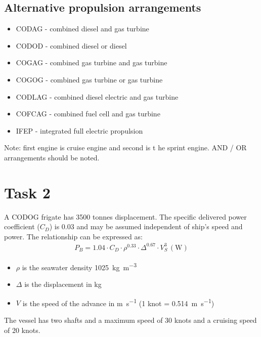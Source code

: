 \subsection{Alternative propulsion arrangements}
\begin{itemize}
    \item CODAG - combined diesel and gas turbine
    \item CODOD - combined diesel or diesel
    \item COGAG - combined gas turbine and gas turbine
    \item COGOG - combined gas turbine or gas turbine
    \item CODLAG - combined diesel electric and gas turbine
    \item COFCAG - combined fuel cell and gas turbine
    \item IFEP - integrated full electric propulsion
\end{itemize}
Note: first engine is cruise engine and second is t he sprint engine. AND / OR arrangements should be noted.
\section{Task 2}
A CODOG frigate has 3500 tonnes displacement. The specific delivered power coefficient ($C_D$) is 0.03 and may be assumed independent of ship's speed and power. The relationship can be expressed as:
\begin{gather}
    P_B = 1.04 \cdot C_D \cdot \rho^{0.33}\cdot \Delta^{0.67}\cdot V_S^3 \, (\si{\watt})
\end{gather}
\begin{itemize}
    \item $\rho$ is the seawater density \SI{1025}{\kilo\gram\per\meter\cubed}
    \item $\Delta$ is the displacement in \si{kg}
    \item $V$ is the speed of the advance in \si{\meter\per\second} (1 knot = \SI{0.514}{\meter\per\second})
\end{itemize}
The vessel has two shafts and a maximum speed of 30 knots and a cruising speed of 20 knots.

